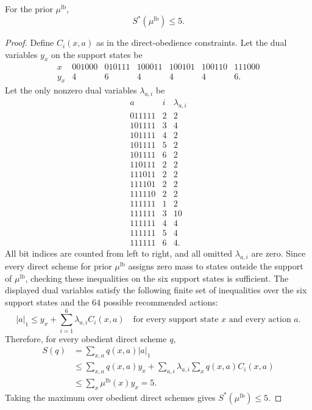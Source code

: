 \documentclass[format=acmsmall, review=false]{acmart}
\begin{document}
\begin{lemma}
\label{lem:six-bit-dual}
For the prior $\mu^{\mathrm{lb}}$,
\[
S^*(\mu^{\mathrm{lb}})\leq 5.
\]
\end{lemma}

\begin{proof}
Define $C_i(x,a)$ as in the direct-obedience constraints. Let the dual variables
$y_x$ on the support states be
\[
\begin{array}{c|cccccc}
x & 001000 & 010111 & 100011 & 100101 & 100110 & 111000\\
\hline
y_x & 4 & 6 & 4 & 4 & 4 & 6.
\end{array}
\]
Let the only nonzero dual variables $\lambda_{a,i}$ be
\[
\begin{array}{c|c|c}
a & i & \lambda_{a,i}\\
\hline
011111 & 2 & 2\\
101111 & 3 & 4\\
101111 & 4 & 2\\
101111 & 5 & 2\\
101111 & 6 & 2\\
110111 & 2 & 2\\
111011 & 2 & 2\\
111101 & 2 & 2\\
111110 & 2 & 2\\
111111 & 1 & 2\\
111111 & 3 & 10\\
111111 & 4 & 4\\
111111 & 5 & 4\\
111111 & 6 & 4.
\end{array}
\]
All bit indices are counted from left to right, and all omitted
$\lambda_{a,i}$ are zero. Since every direct scheme for prior $\mu^{\mathrm{lb}}$
assigns zero mass to states outside the support of $\mu^{\mathrm{lb}}$, checking
these inequalities on the six support states is sufficient. The displayed dual
variables satisfy the following finite set of inequalities over the six support
states and the $64$ possible recommended actions:
\[
|a|_1\leq y_x+\sum_{i=1}^6 \lambda_{a,i}C_i(x,a)
\quad\text{for every support state }x\text{ and every action }a.
\]
Therefore, for every obedient direct scheme $q$,
\[
\begin{aligned}
S(q)
&=\sum_{x,a} q(x,a)|a|_1\\
&\leq
\sum_{x,a}q(x,a)y_x
+\sum_{a,i}\lambda_{a,i}\sum_x q(x,a)C_i(x,a)\\
&\leq
\sum_x \mu^{\mathrm{lb}}(x)y_x
=5.
\end{aligned}
\]
Taking the maximum over obedient direct schemes gives
$S^*(\mu^{\mathrm{lb}})\leq 5$.
\end{proof}
\end{document}
